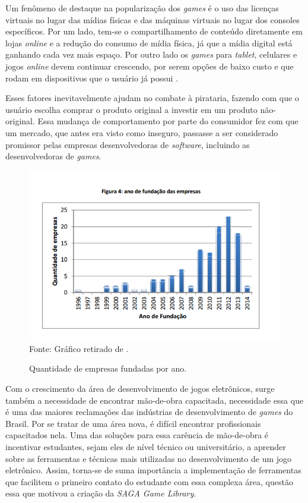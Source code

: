 
Um fenômeno de destaque na popularização dos \textit{games} é o uso das licenças virtuais no lugar das mídias físicas e das máquinas virtuais no lugar dos consoles específicos. Por um lado, tem-se o compartilhamento de conteúdo diretamente em lojas \textit{online} e a redução do consumo de mídia física, já que a mídia digital está ganhando cada vez mais espaço. Por outro lado os \textit{games} para \textit{tablet}, celulares e jogos \textit{online} devem continuar crescendo, por serem opções de baixo custo e que rodam em dispositivos que o usuário já possui \cite{ESTADAO}.

Esses fatores inevitavelmente ajudam no combate à pirataria, fazendo com que o usuário escolha comprar o produto original a investir em um produto não-original. Essa mudança de comportamento por parte do consumidor fez com que um mercado, que antes era visto como inseguro, passasse a ser considerado promissor pelas empresas desenvolvedoras de \textit{software}, incluindo as desenvolvedoras de \textit{games}.
%
%
%
\begin{figure}[h]
    \centering
    \caption{Quantidade de empresas fundadas por ano.}
    \label{AnoFundacaoEmpresas}
    \includegraphics[scale = 0.80]{Imagens/AnoFundacaoEmpresas.png}
    \\ Fonte: Gráfico retirado de \cite{GEDIGames}.
\end{figure}
%
%
%
\par
Com o crescimento da área de desenvolvimento de jogos eletrônicos, surge também a necessidade de encontrar mão-de-obra capacitada, necessidade essa que é uma das maiores reclamações das indústrias de desenvolvimento de \textit{games} do Brasil. Por se tratar de uma área nova, é difícil encontrar profissionais capacitados nela. Uma das soluções para essa carência de mão-de-obra é incentivar estudantes, sejam eles de nível técnico ou universitário, a aprender sobre as ferramentas e técnicas mais utilizadas no desenvolvimento de um jogo eletrônico. Assim, torna-se de suma importância a implementação de ferramentas que facilitem o primeiro contato do estudante com essa complexa área, questão essa que motivou a criação da \textit{SAGA Game Library}.
%
%
